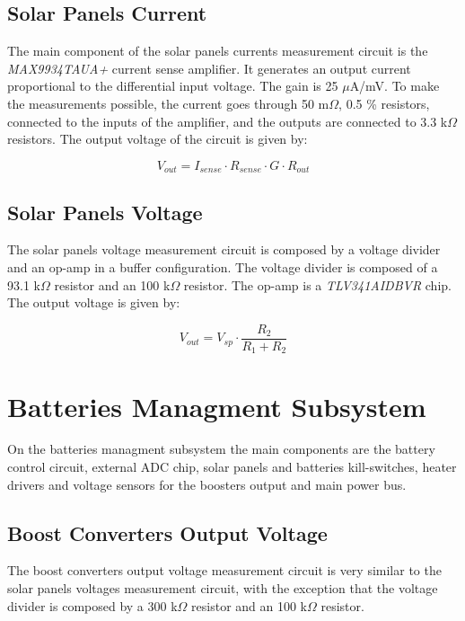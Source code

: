 \subsection{Solar Panels Current}

The main component of the solar panels currents measurement circuit is the \textit{MAX9934TAUA+} current sense amplifier. It generates an output current proportional to the differential input voltage. The gain is 25 $\mu$A/mV. To make the measurements possible, the current goes through 50 m$\Omega$, 0.5 \% resistors, connected to the inputs of the amplifier, and the outputs are connected to 3.3 k$\Omega$ resistors. The output voltage of the circuit is given by:

\begin{equation}
V_{out} = I_{sense} \cdot R_{sense} \cdot G \cdot R_{out}
\end{equation}

\subsection{Solar Panels Voltage}

The solar panels voltage measurement circuit is composed by a voltage divider and an op-amp in a buffer configuration. The voltage divider is composed of a 93.1 k$\Omega$ resistor and an 100 k$\Omega$ resistor. The op-amp is a \textit{TLV341AIDBVR} chip. The output voltage is given by:

\begin{equation}
V_{out} = V_{sp} \cdot \frac{R_{2}}{R_{1} + R_{2}}
\end{equation}

\section{Batteries Managment Subsystem}

On the batteries managment subsystem the main components are the battery control circuit, external ADC chip, solar panels and batteries kill-switches, heater drivers and voltage sensors for the boosters output and main power bus. 

\subsection{Boost Converters Output Voltage}

The boost converters output voltage measurement circuit is very similar to the solar panels voltages measurement circuit, with the exception that the voltage divider is composed by a 300 k$\Omega$ resistor and an 100 k$\Omega$ resistor.

